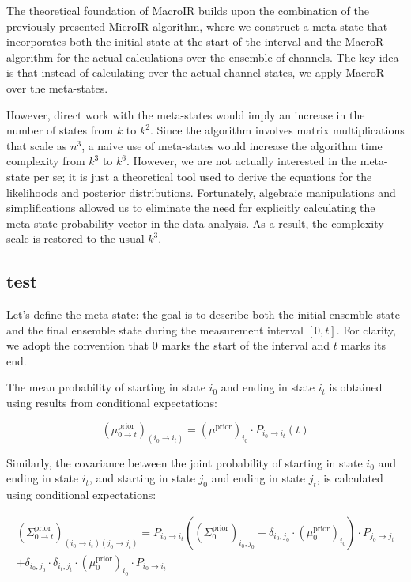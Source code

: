 \documentclass[pdflatex,sn-mathphys-num]{sn-jnl}%
\theoremstyle{thmstyleone}%
\theoremstyle{thmstyletwo}%
\theoremstyle{thmstylethree}%
\begin{document}
The theoretical foundation of MacroIR builds upon the combination of the previously presented MicroIR algorithm, where we construct a meta-state that incorporates both the initial state at the start of the interval and the MacroR algorithm for the actual calculations over the ensemble of channels. The key idea is that instead of calculating over the actual channel states, we apply MacroR over the meta-states.

However, direct work with the meta-states would imply an increase in the number of states from $k$ to $k^2$. Since the algorithm involves matrix multiplications that scale as $n^3$, a naive use of meta-states would increase the algorithm time complexity from $k^3$ to $k^6$. However, we are not actually interested in the meta-state per se; it is just a theoretical tool used to derive the equations for the likelihoods and posterior distributions. Fortunately, algebraic manipulations and simplifications allowed us to eliminate the need for explicitly calculating the meta-state probability vector in the data analysis. As a result, the complexity scale is restored to the usual $k^3$.

\subsection{test}

Let's define the meta-state: the goal is to describe both the initial ensemble state and the final ensemble state during the measurement interval \( [0, t] \). For clarity, we adopt the convention that \( 0 \) marks the start of the interval and \( t \) marks its end.

The mean probability of starting in state \( i_0 \) and ending in state \( i_t \) is obtained using results from conditional expectations:

\begin{equation}
	(\mu^{\text{prior}}_{0 \rightarrow t})_{(i_0 \rightarrow i_t)} = (\mu^{\text{prior}})_{i_0} \cdot P_{i_0 \rightarrow i_t}(t)
	\label{eq:meta_mean_prior}
\end{equation}

Similarly, the covariance between the joint probability of starting in state \( i_0 \) and ending in state \( i_t \), and starting in state \( j_0 \) and ending in state \( j_t \), is calculated using conditional expectations:

\begin{multline}
	(\Sigma^{\text{prior}}_{0 \rightarrow t})_{(i_0 \rightarrow i_t)(j_0 \rightarrow j_t)} = 
	P_{i_0 \rightarrow i_t} \left((\Sigma^{\text{prior}}_0)_{i_0, j_0} - \delta_{i_0, j_0} \cdot (\mu^{\text{prior}}_0)_{i_0}\right) \cdot P_{j_0 \rightarrow j_t} \\
	+ \delta_{i_0, j_0} \cdot \delta_{i_t, j_t} \cdot (\mu^{\text{prior}}_0)_{i_0} \cdot P_{i_0 \rightarrow i_t}
	\label{eq:meta_covariance_prior}
\end{multline}
\end{document}
